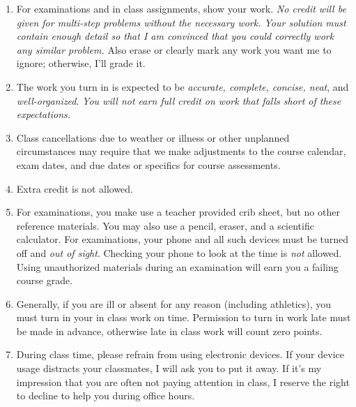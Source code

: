 \documentclass[12pt]{article}
\newcounter{ex}\setcounter{ex}{0}
\begin{document}
\begin{enumerate}

\item For examinations and in class assignments, show your work.  \emph{No credit will be given for multi-step problems without the necessary work. Your solution must contain enough detail
so that I am convinced that you could correctly work any similar problem.} Also erase or clearly mark any work you want me to ignore; otherwise,
I'll grade it.  

\item The work you turn in is expected to be \emph{accurate, 
complete, concise, neat}, and \emph{well-organized}.  
\emph{You will not earn full credit on work that falls short of 
these expectations.}

\item Class cancellations due to weather or illness or other 
unplanned circumstances may require that we make  adjustments
to the course calendar, exam dates, and due dates or specifics for 
course assessments. 


\item Extra credit is not allowed. 


\item For examinations, you make use a teacher provided crib sheet, 
but no other reference materials. You may also use a pencil, eraser, 
and a scientific calculator. For examinations, your phone and all such
devices must be turned off and \emph{out of sight}. Checking your phone
to look at the time is \emph{not} allowed. Using unauthorized 
materials during an examination will earn you a failing course grade.

\item Generally, if you are ill or absent for any reason (including 
athletics), you must turn in your in class work on time. Permission to
turn in work late must be made in advance, otherwise late in class work 
will count zero points.


 

\item During class time, please refrain from using electronic devices. If your 
device usage distracts your classmates, I will ask you to put it away. If it's my 
impression that you are often not paying attention in class, I reserve the right to 
decline to help you during office hours.


\end{enumerate}
\end{document}
